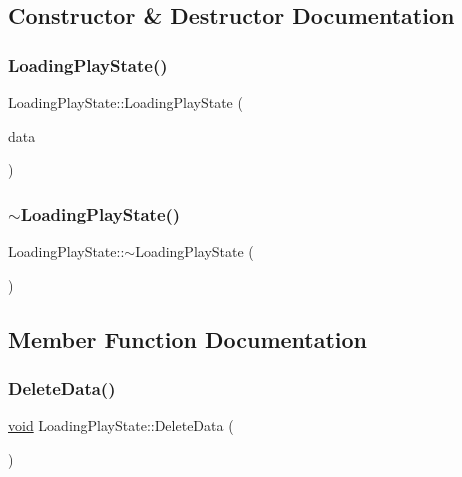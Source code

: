 \subsection{Constructor \& Destructor Documentation}
\mbox{\label{classLoadingPlayState_a9715c14eced0140ceb64d6e30d00901e}} 
\subsubsection{\texorpdfstring{Loading\+Play\+State()}{LoadingPlayState()}}
{\footnotesize\ttfamily Loading\+Play\+State\+::\+Loading\+Play\+State (\begin{DoxyParamCaption}\item[{\hyperlink{structGameData}{Game\+Data} \&}]{data }\end{DoxyParamCaption})}

\mbox{\label{classLoadingPlayState_a46ffa983ebd3acac941838a564474550}} 
\subsubsection{\texorpdfstring{$\sim$\+Loading\+Play\+State()}{~LoadingPlayState()}}
{\footnotesize\ttfamily Loading\+Play\+State\+::$\sim$\+Loading\+Play\+State (\begin{DoxyParamCaption}{ }\end{DoxyParamCaption})}



\subsection{Member Function Documentation}
\mbox{\label{classLoadingPlayState_a3735d8ecb6747de9ab62dddedf9eeaa3}} 
\subsubsection{\texorpdfstring{Delete\+Data()}{DeleteData()}}
{\footnotesize\ttfamily \hyperlink{imgui__impl__opengl3__loader_8h_ac668e7cffd9e2e9cfee428b9b2f34fa7}{void} Loading\+Play\+State\+::\+Delete\+Data (\begin{DoxyParamCaption}{ }\end{DoxyParamCaption})\hspace{0.3cm}{\ttfamily [virtual]}}



